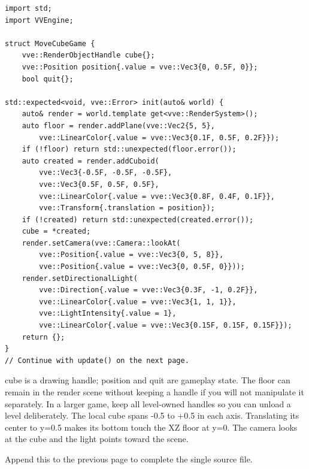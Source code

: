 \documentclass[11pt,a4paper]{article}
\begin{document}
\begin{lstlisting}[language={}]
import std;
import VVEngine;

struct MoveCubeGame {
    vve::RenderObjectHandle cube{};
    vve::Position position{.value = vve::Vec3{0, 0.5F, 0}};
    bool quit{};

std::expected<void, vve::Error> init(auto& world) {
    auto& render = world.template get<vve::RenderSystem>();
    auto floor = render.addPlane(vve::Vec2{5, 5},
        vve::LinearColor{.value = vve::Vec3{0.1F, 0.5F, 0.2F}});
    if (!floor) return std::unexpected(floor.error());
    auto created = render.addCuboid(
        vve::Vec3{-0.5F, -0.5F, -0.5F},
        vve::Vec3{0.5F, 0.5F, 0.5F},
        vve::LinearColor{.value = vve::Vec3{0.8F, 0.4F, 0.1F}},
        vve::Transform{.translation = position});
    if (!created) return std::unexpected(created.error());
    cube = *created;
    render.setCamera(vve::Camera::lookAt(
        vve::Position{.value = vve::Vec3{0, 5, 8}},
        vve::Position{.value = vve::Vec3{0, 0.5F, 0}}));
    render.setDirectionalLight(
        vve::Direction{.value = vve::Vec3{0.3F, -1, 0.2F}},
        vve::LinearColor{.value = vve::Vec3{1, 1, 1}},
        vve::LightIntensity{.value = 1},
        vve::LinearColor{.value = vve::Vec3{0.15F, 0.15F, 0.15F}});
    return {};
}
// Continue with update() on the next page.
\end{lstlisting}

cube is a drawing handle; position and quit are gameplay state. The floor can remain in the render scene without keeping a handle if you will not manipulate it separately. In a larger game, keep all level-owned handles so you can unload a level deliberately. The local cube spans -0.5 to +0.5 in each axis. Translating its center to y=0.5 makes its bottom touch the XZ floor at y=0. The camera looks at the cube and the light points toward the scene.

\label{core-55}
Append this to the previous page to complete the single source file.
\end{document}
